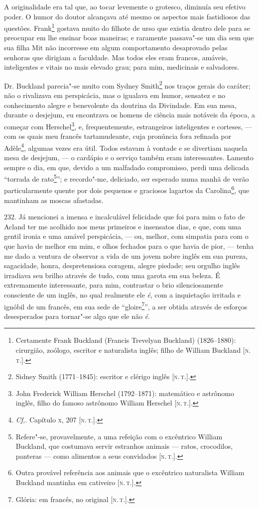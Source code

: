 A originalidade era tal que, ao tocar levemente o grotesco, diminuía seu
efetivo poder. O humor do doutor alcançava até mesmo os aspectos mais
fastidiosos das questões. Frank\footnote{Certamente Frank Buckland
  (Francis Trevelyan Buckland) (1826--1880): cirurgião, zoólogo, escritor
  e naturalista inglês; filho de William Buckland {[}\textsc{n.\,t.}{]}.}
gostava muito do filhote de urso que existia dentro dele para se
preocupar em lhe ensinar boas maneiras; e raramente passava"-se um dia
sem que sua filha Mit não incorresse em algum comportamento desaprovado
pelas senhoras que dirigiam a faculdade. Mas todos eles eram francos,
amáveis, inteligentes e vitais no mais elevado grau; para mim,
medicinais e salvadores.

Dr. Buckland parecia"-se muito com Sydney Smith\footnote{Sidney Smith
  (1771--1845): escritor e clérigo inglês {[}\textsc{n.\,t.}{]}.} nos traços
gerais do caráter; não o rivalizava em perspicácia, mas o igualava em
humor, sensatez e no conhecimento alegre e benevolente da doutrina da
Divindade. Em sua mesa, durante o desjejum, eu encontrava os homens de
ciência mais notáveis da época, a começar com Herschel\footnote{John
  Frederick William Herschel (1792--1871): matemático e astrônomo inglês,
  filho do famoso astrônomo William Herschel {[}\textsc{n.\,t.}{]}.}, e,
frequentemente, estrangeiros inteligentes e corteses, --- com os quais
meu francês tartamudeante, cuja pronúncia fora refinada por
Adèle\footnote{\emph{Cf,}. Capítulo \textsc{x}, 207 {[}\textsc{n.\,t.}{]}.}, algumas
vezes era útil. Todos estavam à vontade e se divertiam naquela mesa de
desjejum, --- o cardápio e o serviço também eram interessantes. Lamento
sempre o dia, em que, devido a um malfadado compromisso, perdi uma
delicada ``torrada de rato\footnote{Refere"-se, provavelmente, a uma
  refeição com o excêntrico William Buckland, que costumava servir
  estranhos animais --- ratos, crocodilos, panteras --- como alimentos a
  seus convidados {[}\textsc{n.\,t.}{]}.}''; e recordo"-me, deliciado, ser
esperado numa manhã de verão particularmente quente por dois pequenos e
graciosos lagartos da Carolina\footnote{Outra provável referência aos
  animais que o excêntrico naturalista William Buckland mantinha em
  cativeiro {[}\textsc{n.\,t.}{]}.}, que mantinham as moscas afastadas.

232. Já mencionei a imensa e incalculável felicidade que foi para mim o
fato de Acland ter me acolhido nos meus primeiros e insensatos dias, e
que, com uma gentil ironia e uma amável perspicácia, --- ou, melhor, com
simpatia para com o que havia de melhor em mim, e olhos fechados para o
que havia de pior, --- tenha me dado a ventura de observar a vida de um
jovem nobre inglês em sua pureza, sagacidade, honra, despretensiosa
coragem, alegre piedade; seu orgulho inglês irradiava seu brilho através
de tudo, com uma garota em sua beleza. É extremamente interessante, para
mim, contrastar o brio silenciosamente consciente de um inglês, no qual
realmente ele \emph{é}, com a inquietação irritada e ignóbil de um
francês, em sua sede de ``gloire\footnote{Glória: em francês, no
  original {[}\textsc{n.\,t.}{]}.}'', a ser obtida através de esforços
desesperados para tornar"-se algo que ele não \emph{é}.

